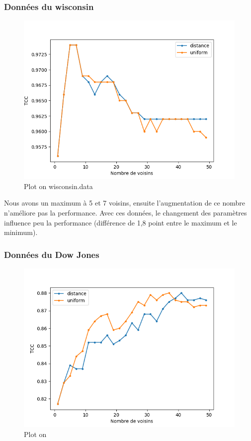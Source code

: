 \documentclass[10pt,letterpaper]{article}
\begin{document}
\subsubsection*{Données du wisconsin}
\begin{figure}[H]
\centering
\includegraphics[scale=0.65]{images/wisc_ppv.png}
\caption{Plot on wisconsin.data}
\end{figure}
Nous avons un maximum à 5 et 7 voisins, ensuite l’augmentation de ce nombre n’améliore pas la performance. Avec ces données, le changement des paramètres influence peu la performance (différence de 1,8 point entre le maximum et le minimum).
\subsubsection*{Données du Dow Jones}
\begin{figure}[H]
\centering
\includegraphics[scale=0.65]{images/dj_ppv.png}
\caption{Plot on \protect{}}
\end{figure}
\end{document}
